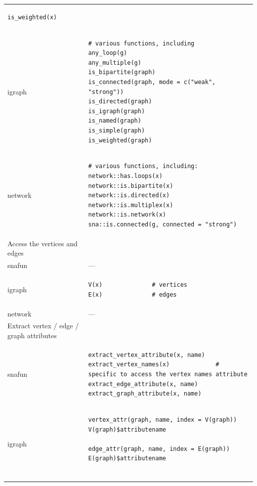 \documentclass[
]{article}
\begin{document}
\begin{longtable}{ll}
\begin{verbatim}
is_weighted(x)
\end{verbatim} \\ 
igraph & \begin{verbatim}
# various functions, including
any_loop(g)
any_multiple(g)
is_bipartite(graph)
is_connected(graph, mode = c("weak", "strong"))
is_directed(graph)
is_igraph(graph)
is_named(graph)
is_simple(graph)
is_weighted(graph)
\end{verbatim} \\ 
network & \begin{verbatim}
# various functions, including:
network::has.loops(x)
network::is.bipartite(x)
network::is.directed(x)
network::is.multiplex(x)
network::is.network(x)
sna::is.connected(g, connected = "strong")
\end{verbatim} \\ 
\midrule
\multicolumn{1}{l}{Access the vertices and edges} \\ 
\midrule
snafun & — \\ 
igraph & \begin{verbatim}
V(x)              # vertices
E(x)              # edges
\end{verbatim} \\ 
network & — \\ 
\midrule
\multicolumn{1}{l}{Extract vertex / edge / graph attributes} \\ 
\midrule
snafun & \begin{verbatim}
extract_vertex_attribute(x, name)
extract_vertex_names(x)             # specific to access the vertex names attribute
extract_edge_attribute(x, name)
extract_graph_attribute(x, name)
\end{verbatim} \\ 
igraph & \begin{verbatim}
vertex_attr(graph, name, index = V(graph))
V(graph)$attributename

edge_attr(graph, name, index = E(graph))
E(graph)$attributename


\end{verbatim}
\end{longtable}
\end{document}
